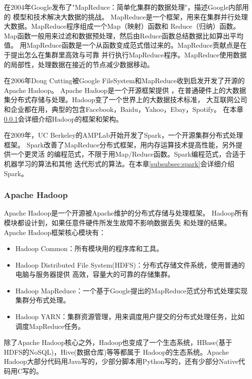 在2004年Google发布了"MapReduce：简单化集群的数据处理"，描述Google内部用的
模型和技术解决大数据的挑战。\cite{dean2008mapreduce}
MapReduce是一个框架，用来在集群并行处理大数据。MapReduce程序组成一个Map（映射）函数和
Reduce（归纳）函数。Map函数一般用来过滤和数据预处理，然后由Reduce函数总结数据比如算出平均值。
用MapReduce函数是一个从函数变成范式借过来的。MapReduce贡献点是在于提出怎么在集群里高效与可靠
并行执行MapReduce程序。MapReduce使用数据的局部性，处理数据在接近的节点减少数据移动。

在2006年Doug Cutting被Google FileSystem和MapReduce收到启发开发了开源的Apache Hadoop。
\cite{gfs2003, dean2008mapreduce, wiki:hadoop}Apache Hadoop是一个开源框架提供
，在普通硬件上的大数据集分布式存储与处理。Hadoop变了一个世界上的大数据技术标准，
大互联网公司和企业都在用，典型的包含Facebook，Baidu，Yahoo，Ebay，Spotify。
在本章\ref{subsubsec:hadoop}会详细介绍Hadoop的框架和架构。

在2009年，UC Berkeley的AMPLab开始开发了Spark，一个开源集群分布式处理框架。\cite{wiki:spark}
Spark改善了MapReduce分布式框架，用内存运算技术提高性能，另外提供一个更灵活
的编程范式，不限于用Map/Reduce函数。Spark编程范式，合适于机器学习的算法和其他
迭代形式的算法。在本章\ref{subsubsec:spark}会详细介绍Spark。



\subsubsection{Apache Hadoop}
\label{subsubsec:hadoop}
Apache Hadoop是一个开源被Apache维护的分布式存储与处理框架。
Hadoop所有模块都设计到，如果任意件硬件所发生故障不影响数据丢失
和处理的结果。
Apache Hadoop框架核心模块有：
\begin{itemize}
  \item Hadoop Common：所有模块用的程序库和工具。
  \item Hadoop Distributed File System(HDFS)：分布式存储文件系统，使用普通的电脑与服务器提供
        高效，容量大的可靠的存储集群。
  \item Hadoop MapReduce：一个基于Google提出的MapReduce范式分布式处理实现集群分布式处理。
  \item Hadoop YARN：集群资源管理，用来调度用户提交的分布式处理任务，比如调度MapReduce任务。
\end{itemize}
除了Apache Hadoop核心之外，Hadoop也变成了一个生态系统，HBase(基于HDFS的NoSQL)，Hive(数据仓库)等等都属于
Hadoop的生态系统。Apache Hadoop大部分代码用Java写的，少部分脚本用Python写的，还有少部分Native代码用C写的。

